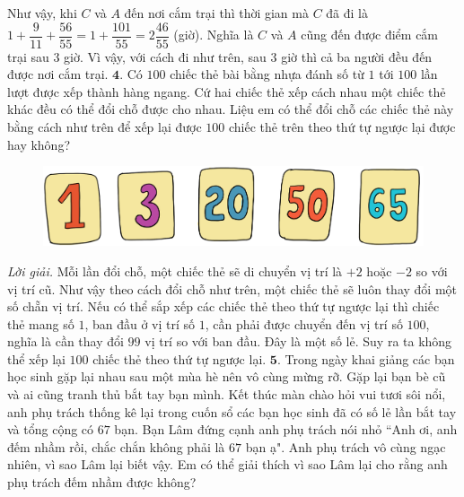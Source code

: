 \begin{multicols}{2}
	\vskip 0.1cm
	Như vậy, khi $C$ và $A$ đến nơi cắm trại thì thời gian mà $C$ đã đi là $1 + \dfrac{9}{11}+ \dfrac{56}{55}=1 + \dfrac{101}{55}= 2\dfrac{46}{55}$ (giờ). Nghĩa là $C$ và $A$ cũng đến được điểm cắm trại sau $3$ giờ. Vì vậy, với cách đi như trên, sau $3$ giờ thì cả ba người đều đến được nơi cắm trại.
	\vskip 0.1cm
	$\pmb{4.}$ Có $100$ chiếc thẻ bài bằng nhựa đánh số từ $1$ tới $100$ lần lượt được xếp thành hàng ngang. Cứ hai chiếc thẻ xếp cách nhau một chiếc thẻ khác đều có thể đổi chỗ được cho nhau. Liệu em có thể đổi chỗ các chiếc thẻ này bằng cách như trên để xếp lại được $100$ chiếc thẻ trên theo thứ tự ngược lại được hay không?
	\begin{figure}[H]
		\centering
		\vspace*{-10pt}
		\captionsetup{labelformat= empty, justification=centering}
		\includegraphics[width=0.98\linewidth]{Pi10_ToanBi_Bai4}
		\vspace*{-10pt}
	\end{figure}
	\textit{Lời giải.} 	Mỗi lần đổi chỗ, một chiếc thẻ sẽ di chuyển vị trí là $+2$ hoặc $-2$ so với vị trí cũ. Như vậy theo cách đổi chỗ như trên, một chiếc thẻ sẽ luôn thay đổi một số chẵn vị trí. Nếu có thể sắp xếp các chiếc thẻ theo thứ tự ngược lại thì chiếc thẻ mang số $1$, ban đầu ở vị trí số $1$, cần phải được chuyển đến vị trí số $100$, nghĩa là cần thay đổi $99$ vị trí so với ban đầu. Đây là một số lẻ. Suy ra ta không thể xếp lại $100$ chiếc thẻ theo thứ tự ngược lại.
	\vskip 0.1cm
	$\pmb{5.}$ Trong ngày khai giảng các bạn học sinh gặp lại nhau sau một mùa hè nên vô cùng mừng rỡ. Gặp lại bạn bè cũ và ai cũng tranh thủ bắt tay bạn mình. Kết thúc màn chào hỏi vui tươi sôi nổi, anh phụ trách thống kê lại trong cuốn sổ các bạn học sinh đã có số lẻ lần bắt tay và tổng cộng có $67$ bạn. Bạn Lâm đứng cạnh anh phụ trách nói nhỏ ``Anh ơi, anh đếm nhầm rồi, chắc chắn không phải là $67$ bạn ạ". Anh phụ trách vô cùng ngạc nhiên, vì sao Lâm lại biết vậy. Em có thể giải thích vì sao Lâm lại cho rằng anh phụ trách đếm nhầm được không?
	\begin{figure}[H]
		\centering
		\vspace*{-10pt}
		\captionsetup{labelformat= empty, justification=centering}

\end{figure}
\end{multicols}
